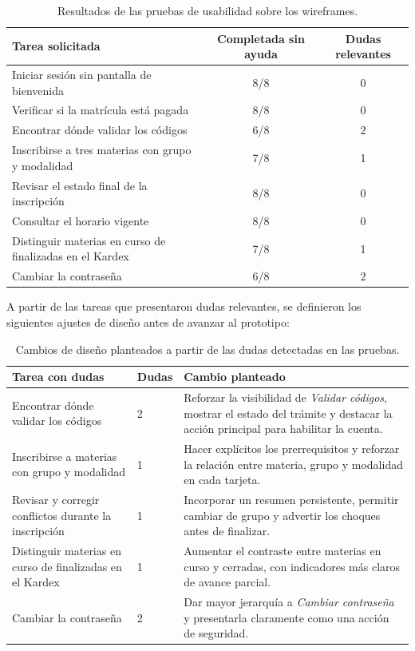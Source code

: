 \begin{table}[H]
\centering
\begin{tabular}{|p{6.5cm}|c|c|}
\hline
\textbf{Tarea solicitada} & \textbf{Completada sin ayuda} & \textbf{Dudas relevantes} \\
\hline
Iniciar sesión sin pantalla de bienvenida & 8/8 & 0 \\
\hline
Verificar si la matrícula está pagada & 8/8 & 0 \\
\hline
Encontrar dónde validar los códigos & 6/8 & 2 \\
\hline
Inscribirse a tres materias con grupo y modalidad & 7/8 & 1 \\
\hline
Revisar el estado final de la inscripción & 8/8 & 0 \\
\hline
Consultar el horario vigente & 8/8 & 0 \\
\hline
Distinguir materias en curso de finalizadas en el Kardex & 7/8 & 1 \\
\hline
Cambiar la contraseña & 6/8 & 2 \\
\hline
\end{tabular}
\caption{Resultados de las pruebas de usabilidad sobre los wireframes.}
\label{tab:pruebas-wireframes}
\end{table}

\noindent A partir de las tareas que presentaron dudas relevantes, se definieron los siguientes ajustes de diseño antes de avanzar al prototipo:

\begin{table}[H]
\centering
\begin{tabular}{|p{6.0cm}|p{2.3cm}|p{6.5cm}|}
\hline
\textbf{Tarea con dudas} & \textbf{Dudas} & \textbf{Cambio planteado} \\
\hline
Encontrar d\'onde validar los c\'odigos & 2 & Reforzar la visibilidad de \textit{Validar c\'odigos}, mostrar el estado del tr\'amite y destacar la acci\'on principal para habilitar la cuenta. \\
\hline
Inscribirse a materias con grupo y modalidad & 1 & Hacer expl\'icitos los prerrequisitos y reforzar la relaci\'on entre materia, grupo y modalidad en cada tarjeta. \\
\hline
Revisar y corregir conflictos durante la inscripci\'on & 1 & Incorporar un resumen persistente, permitir cambiar de grupo y advertir los choques antes de finalizar. \\
\hline
Distinguir materias en curso de finalizadas en el Kardex & 1 & Aumentar el contraste entre materias en curso y cerradas, con indicadores m\'as claros de avance parcial. \\
\hline
Cambiar la contrase\~na & 2 & Dar mayor jerarqu\'ia a \textit{Cambiar contrase\~na} y presentarla claramente como una acci\'on de seguridad. \\
\hline
\end{tabular}
\caption{Cambios de diseño planteados a partir de las dudas detectadas en las pruebas.}
\label{tab:ajustes-wireframes-dudas}
\end{table}

